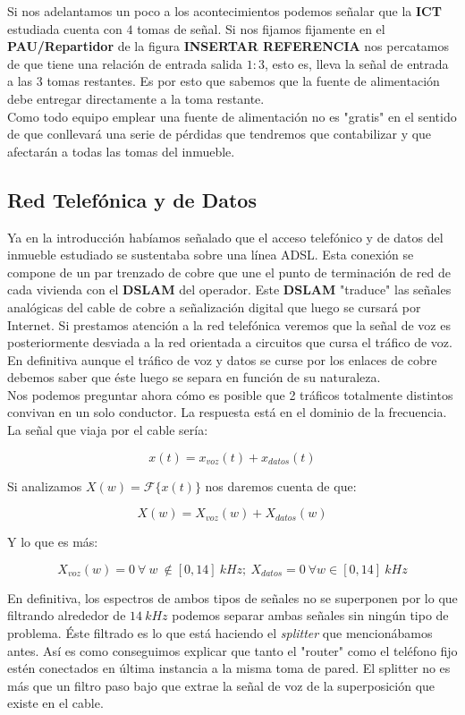 \documentclass{article}[12 pt]
\begin{document}
			Si nos adelantamos un poco a los acontecimientos podemos señalar que la \textbf{ICT} estudiada cuenta con $4$ tomas de señal. Si nos fijamos fijamente en el \textbf{PAU/Repartidor} de la figura \textbf{INSERTAR REFERENCIA} nos percatamos de que tiene una relación de entrada salida $1:3$, esto es, lleva la señal de entrada a las $3$ tomas restantes. Es por esto que sabemos que la fuente de alimentación debe entregar directamente a la toma restante.\\

			Como todo equipo emplear una fuente de alimentación no es "gratis" en el sentido de que conllevará una serie de pérdidas que tendremos que contabilizar y que afectarán a todas las tomas del inmueble.\\

		\subsection{Red Telefónica y de Datos}
			Ya en la introducción habíamos señalado que el acceso telefónico y de datos del inmueble estudiado se sustentaba sobre una línea ADSL. Esta conexión se compone de un par trenzado de cobre que une el punto de terminación de red de cada vivienda con el \textbf{DSLAM} del operador. Este \textbf{DSLAM} "traduce" las señales analógicas del cable de cobre a señalización digital que luego se cursará por Internet. Si prestamos atención a la red telefónica veremos que la señal de voz es posteriormente desviada a la red orientada a circuitos que cursa el tráfico de voz. En definitiva aunque el tráfico de voz y datos se curse por los enlaces de cobre debemos saber que éste luego se separa en función de su naturaleza.\\

			Nos podemos preguntar ahora cómo es posible que 2 tráficos totalmente distintos convivan en un solo conductor. La respuesta está en el dominio de la frecuencia. La señal que viaja por el cable sería:

			$$x(t) = x_{voz}(t) + x_{datos}(t)$$

			Si analizamos $X(w) = \mathcal{F}\{x(t)\}$ nos daremos cuenta de que:

			$$X(w) = X_{voz}(w) + X_{datos}(w)$$

			Y lo que es más:

			$$X_{voz}(w) = 0\ \forall \ w \ \notin [0, 14]\ kHz;\ X_{datos} = 0\ \forall w \in [0, 14]\ kHz$$

			En definitiva, los espectros de ambos tipos de señales no se superponen por lo que filtrando alrededor de $14\ kHz$ podemos separar ambas señales sin ningún tipo de problema. Éste filtrado es lo que está haciendo el \textit{splitter} que mencionábamos antes. Así es como conseguimos explicar que tanto el "router" como el teléfono fijo estén conectados en última instancia a la misma toma de pared. El splitter no es más que un filtro paso bajo que extrae la señal de voz de la superposición que existe en el cable.\\
\end{document}
